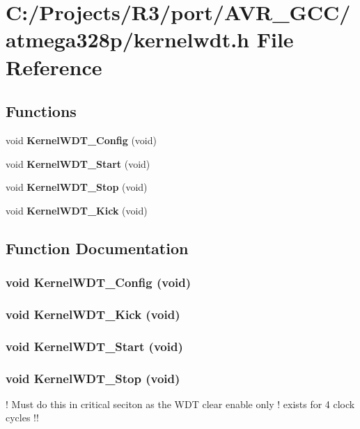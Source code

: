 \section{C:/Projects/R3/port/AVR\_\-GCC/atmega328p/kernelwdt.h File Reference}
\label{kernelwdt_8h}
\subsection*{Functions}
\begin{DoxyCompactItemize}
\item 
void {\bf KernelWDT\_\-Config} (void)
\item 
void {\bf KernelWDT\_\-Start} (void)
\item 
void {\bf KernelWDT\_\-Stop} (void)
\item 
void {\bf KernelWDT\_\-Kick} (void)
\end{DoxyCompactItemize}


\subsection{Function Documentation}
\subsubsection[{KernelWDT\_\-Config}]{\setlength{\rightskip}{0pt plus 5cm}void KernelWDT\_\-Config (void)}\label{kernelwdt_8h_a2e3603d9c31d38767456b1ba83c41989}
\subsubsection[{KernelWDT\_\-Kick}]{\setlength{\rightskip}{0pt plus 5cm}void KernelWDT\_\-Kick (void)}\label{kernelwdt_8h_add93a6fa47977c219ed11e0688301a5d}
\subsubsection[{KernelWDT\_\-Start}]{\setlength{\rightskip}{0pt plus 5cm}void KernelWDT\_\-Start (void)}\label{kernelwdt_8h_a864d589e043766849b02975b4b26a5ab}
\subsubsection[{KernelWDT\_\-Stop}]{\setlength{\rightskip}{0pt plus 5cm}void KernelWDT\_\-Stop (void)}\label{kernelwdt_8h_a430a428d274740d6e234f0fe4ec5b1af}


! Must do this in critical seciton as the WDT clear enable only ! exists for 4 clock cycles !! 